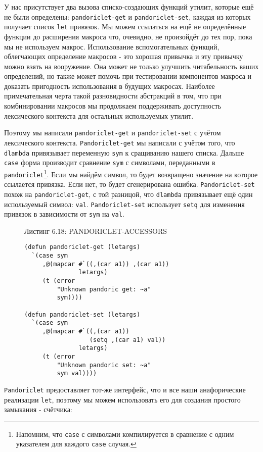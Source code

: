 У нас присутствует два вызова списко-создающих функций утилит, которые ещё не были определены: \verb"pandoriclet-get" и \verb"pandoriclet-set", каждая из которых получает список \verb"let" привязок. Мы можем ссылаться на ещё не определённые функции до расширения макроса что, очевидно, не произойдёт до тех пор, пока мы не используем макрос. Использование вспомогательных функций, облегчающих определение макросов - это хорошая привычка и эту привычку можно взять на вооружение. Она может не только улучшить читабельность ваших определений, но также может помочь при тестировании компонентов макроса и доказать пригодность использования в будущих макросах. Наиболее примечательная черта такой разновидности абстракций в том, что при комбинировании макросов мы продолжаем поддерживать доступность лексического контекста для остальных используемых утилит.

Поэтому мы написали \verb"pandoriclet-get" и \verb"pandoriclet-set" с учётом лексического контекста. \verb"Pandoriclet-get" мы написали с учётом того, что \verb"dlambda" привязывает переменную \verb"sym" к сращиванию нашего списка. Дальше \verb"case" форма производит сравнение \verb"sym" с символами, переданными в \verb"pandoriclet"\footnote{Напомним, что \verb"case" с символами компилируется в сравнение с одним указателем для каждого \verb"case" случая.}. Если мы найдём символ, то будет возвращено значение на которое ссылается привязка. Если нет, то будет сгенерирована ошибка. \verb"Pandoriclet-set" похож на \verb"pandoriclet-get", с той разницой, что \verb"dlambda" привязывает ещё один используемый символ: \verb"val". \verb"Pandoriclet-set" использует \verb"setq" для изменения привязок в зависимости от \verb"sym" на \verb"val".



\begin{figure}Листинг 6.18: PANDORICLET-ACCESSORS\label{listing_6.18}
\listbegin
\begin{verbatim}
(defun pandoriclet-get (letargs)
  `(case sym
     ,@(mapcar #`((,(car a1)) ,(car a1))
               letargs)
     (t (error
         "Unknown pandoric get: ~a"
         sym))))

(defun pandoriclet-set (letargs)
  `(case sym
     ,@(mapcar #`((,(car a1))
                  (setq ,(car a1) val))
               letargs)
     (t (error
         "Unknown pandoric set: ~a"
         sym val))))
\end{verbatim}
\listend
\end{figure}

\verb"Pandoriclet" предоставляет тот-же интерфейс, что и все наши анафорические реализации \verb"let", поэтому мы можем использовать его для создания простого замыкания - счётчика:


